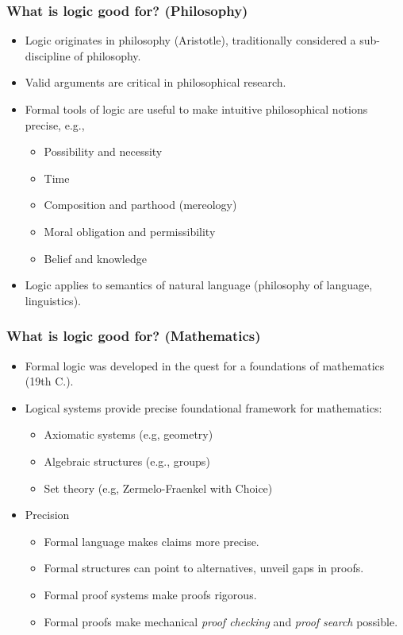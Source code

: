 \begin{frame}
  \frametitle{What is logic good for? (Philosophy)}

  \begin{itemize}[<+->]
  \item Logic originates in philosophy (Aristotle), traditionally considered a sub-discipline of philosophy.
  \item Valid arguments are critical in philosophical research.
  \item Formal tools of logic are useful to make intuitive philosophical
  notions precise, e.g.,
    \begin{itemize}[<+->]
    \item Possibility and necessity
    \item Time
    \item Composition and parthood (mereology)
    \item Moral obligation and permissibility
    \item Belief and knowledge
    \end{itemize}
  \item Logic applies to semantics of natural language (philosophy of
  language, linguistics).
  \end{itemize}
\end{frame}

\begin{frame}
  \frametitle{What is logic good for? (Mathematics)}

  \begin{itemize}[<+->]
  \item Formal logic was developed in the quest for a foundations of
  mathematics (19th C.).
  \item Logical systems provide precise foundational framework for
  mathematics:
    \begin{itemize}[<+->]
    \item Axiomatic systems (e.g, geometry)
    \item Algebraic structures (e.g., groups)
    \item Set theory (e.g, Zermelo-Fraenkel with Choice)
    \end{itemize}
  \item Precision
    \begin{itemize}[<+->]
    \item Formal language makes claims more precise.
    \item Formal structures can point to alternatives, unveil gaps in proofs.
    \item Formal proof systems make proofs rigorous.
    \item Formal proofs make mechanical \emph{proof checking} and \emph{proof search} possible.
    \end{itemize}
  \end{itemize}

\end{frame}


